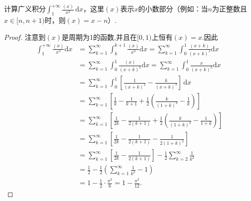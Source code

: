 \documentclass[../../main.tex]{subfiles}%
\begin{document}
\begin{example}
计算广义积分$\int_{1}^{+\infty} \frac{(x)}{x^3}\,\mathrm{d}x$，这里$(x)$表示$x$的小数部分（例如：当$n$为正整数且$x \in [n, n+1)$时，则$(x) = x - n$）.
\end{example}
\begin{proof}
注意到$(x)$是周期为1的函数,并且在$[0,1)$上恒有$(x)=x$.因此
\begin{align*}
\int_1^{+\infty}{\frac{\left( x \right)}{x^3}\mathrm{d}x}&=\sum\limits_{k=1}^{\infty}{\int_k^{k+1}{\frac{\left( x \right)}{x^3}\mathrm{d}x}}=\sum\limits_{k=1}^{\infty}{\int_0^1{\frac{\left( x+k \right)}{\left( x+k \right) ^3}\mathrm{d}x}}
\\
&=\sum\limits_{k=1}^{\infty}{\int_0^1{\frac{\left( x \right)}{\left( x+k \right) ^3}\mathrm{d}x}}=\sum\limits_{k=1}^{\infty}{\int_0^1{\frac{x}{\left( x+k \right) ^3}\mathrm{d}x}}
\\
&=\sum\limits_{k=1}^{\infty}{\int_0^1{\left[ \frac{1}{\left( x+k \right) ^2}-\frac{k}{\left( x+k \right) ^3} \right]\,\mathrm{d}x}}
\\
&=\sum\limits_{k=1}^{\infty}{\left[ \frac{1}{k}-\frac{1}{k+1}+\frac{1}{2}\left( \frac{k}{\left( 1+k \right) ^2}-\frac{1}{k} \right) \right]}
\\
&=\sum\limits_{k=1}^{\infty}{\left[ \frac{1}{2k}-\frac{1}{2\left( k+1 \right)}+\frac{1}{2}\left( \frac{k}{\left( 1+k \right) ^2}-\frac{1}{1+k} \right) \right]}
\\
&=\sum\limits_{k=1}^{\infty}{\left[ \frac{1}{2k}-\frac{1}{2\left( k+1 \right)}-\frac{1}{2\left( 1+k \right) ^2} \right]}
\\
&=\sum\limits_{k=1}^{\infty}{\left[ \frac{1}{2k}-\frac{1}{2\left( k+1 \right)} \right]}-\frac{1}{2}\sum\limits_{k=2}^{\infty}{\frac{1}{k ^2}}
\\
&=\frac{1}{2}-\frac{1}{2}\left( \sum\limits_{k=1}^{\infty}{\frac{1}{k ^2}}-1 \right) 
\\
&=1-\frac{1}{2}\cdot \frac{\pi ^2}{6}=1-\frac{\pi ^2}{12}.
\end{align*}
\end{proof}
\end{document}
